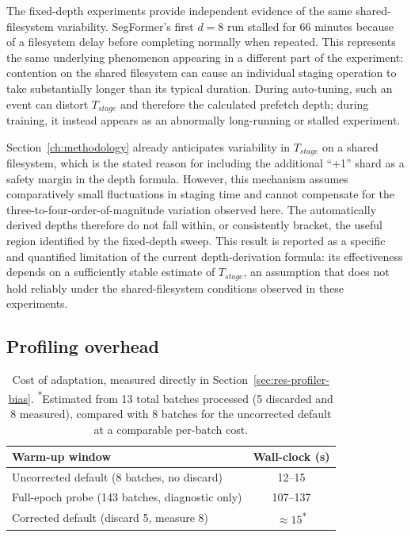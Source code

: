 The fixed-depth experiments provide independent evidence of the same shared-filesystem variability. SegFormer's first $d=8$ run stalled for 66 minutes because of a filesystem delay before completing normally when repeated. This represents the same underlying phenomenon appearing in a different part of the experiment: contention on the shared filesystem can cause an individual staging operation to take substantially longer than its typical duration. During auto-tuning, such an event can distort $T_{stage}$ and therefore the calculated prefetch depth; during training, it instead appears as an abnormally long-running or stalled experiment.

Section~\ref{ch:methodology} already anticipates variability in $T_{stage}$ on a shared filesystem, which is the stated reason for including the additional ``+1'' shard as a safety margin in the depth formula. However, this mechanism assumes comparatively small fluctuations in staging time and cannot compensate for the three-to-four-order-of-magnitude variation observed here. The automatically derived depths therefore do not fall within, or consistently bracket, the useful region identified by the fixed-depth sweep. This result is reported as a specific and quantified limitation of the current depth-derivation formula: its effectiveness depends on a sufficiently stable estimate of $T_{stage}$, an assumption that does not hold reliably under the shared-filesystem conditions observed in these experiments.

\subsection{Profiling overhead}

\begin{table}[!ht]
\centering
\begin{tabular}{lc}
\toprule
Warm-up window & Wall-clock (s) \\
\midrule
Uncorrected default (8 batches, no discard) & 12--15 \\
Full-epoch probe (143 batches, diagnostic only) & 107--137 \\
Corrected default (discard 5, measure 8) & $\approx 15$\textsuperscript{*} \\
\bottomrule
\end{tabular}
\caption[Cost of the profiling window]{Cost of adaptation, measured directly in Section~\ref{sec:res-profiler-bias}. \textsuperscript{*}Estimated from 13 total batches processed (5 discarded and 8 measured), compared with 8 batches for the uncorrected default at a comparable per-batch cost.}
\label{tab:overhead}
\end{table}

